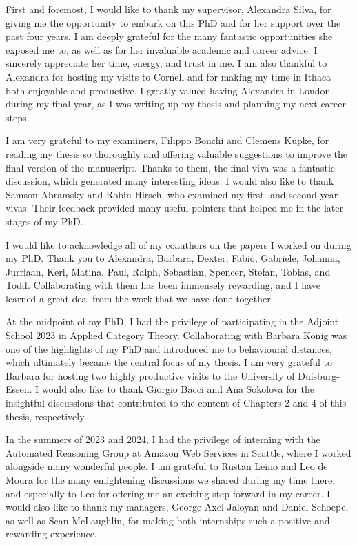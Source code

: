 \begin{acknowledgements}
First and foremost, I would like to thank my supervisor, Alexandra Silva, for giving me the opportunity to embark on this PhD and for her support over the past four years. I am deeply grateful for the many fantastic opportunities she exposed me to, as well as for her invaluable academic and career advice. I sincerely appreciate her time, energy, and trust in me. I am also thankful to Alexandra for hosting my visits to Cornell and for making my time in Ithaca both enjoyable and productive. I greatly valued having Alexandra in London during my final year, as I was writing up my thesis and planning my next career steps.

I am very grateful to my examiners, Filippo Bonchi and Clemens Kupke, for reading my thesis so thoroughly and offering valuable suggestions to improve the final version of the manuscript. Thanks to them, the final viva was a fantastic discussion, which generated many interesting ideas. I would also like to thank Samson Abramsky and Robin Hirsch, who examined my first- and second-year vivas. Their feedback provided many useful pointers that helped me in the later stages of my PhD. 

I would like to acknowledge all of my coauthors on the papers I worked on during my PhD. Thank you to Alexandra, Barbara, Dexter, Fabio, Gabriele, Johanna, Jurriaan, Keri, Matina, Paul, Ralph, Sebastian, Spencer, Stefan, Tobias, and Todd. Collaborating with them has been immensely rewarding, and I have learned a great deal from the work that we have done together.

At the midpoint of my PhD, I had the privilege of participating in the Adjoint School 2023 in Applied Category Theory. Collaborating with Barbara König was one of the highlights of my PhD and introduced me to behavioural distances, which ultimately became the central focus of my thesis. I am very grateful to Barbara for hosting two highly productive visits to the University of Duisburg-Essen.
I would also like to thank Giorgio Bacci and Ana Sokolova for the insightful discussions that contributed to the content of Chapters 2 and 4 of this thesis, respectively.

In the summers of 2023 and 2024, I had the privilege of interning with the Automated Reasoning Group at Amazon Web Services in Seattle, where I worked alongside many wonderful people. I am grateful to Rustan Leino and Leo de Moura for the many enlightening discussions we shared during my time there, and especially to Leo for offering me an exciting step forward in my career. I would also like to thank my managers, George-Axel Jaloyan and Daniel Schoepe, as well as Sean McLaughlin, for making both internships such a positive and rewarding experience.


\end{acknowledgements}
